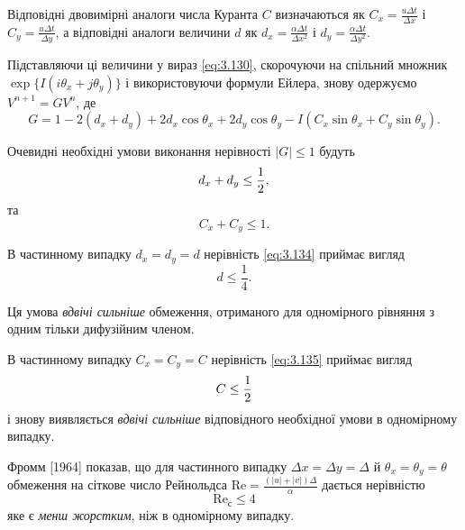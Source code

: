 \begin{definition}
    Відповідні двовимірні аналоги числа Куранта $C$ визначаються як $C_x = \frac{u \Delta t}{\Delta x}$ і $C_y = \frac{u \Delta t}{\Delta y}$, а відповідні аналоги величини $d$ як $d_x = \frac{\alpha \Delta t}{\Delta x^2}$ і $d_y = \frac{\alpha \Delta t}{\Delta y^2}$.
\end{definition}

Підставляючи ці величини у вираз \eqref{eq:3.130}, скорочуючи на спільний множник $\exp\{ I(i \theta_x + j \theta_y) \}$ і використовуючи формули Ейлера, знову одержуємо $V^{n + 1} = G V^n$, де
\begin{equation}
    \label{eq:3.133}
    G = 1 - 2 (d_x + d_y) + 2 d_x \cos \theta_x + 2 d_y \cos \theta_y - I (C_x \sin \theta_x + C_y \sin \theta_y).
\end{equation}

\begin{proposition}
    Очевидні необхідні умови виконання нерівності $|G| \le 1$ будуть
    \begin{equation}
        \label{eq:3.134}
        d_x + d_y \le \frac{1}{2},
    \end{equation}
    та
    \begin{equation}
        \label{eq:3.135}
        C_x + C_y \le 1.
    \end{equation}
\end{proposition}

\begin{example}
    В частинному випадку $d_x = d_y = d$ нерівність \eqref{eq:3.134} приймає вигляд
    \begin{equation}
        \label{eq:3.136}
        d \le \frac{1}{4}.
    \end{equation}
    
    Ця умова \emph{вдвічі сильніше} обмеження, отриманого для одномірного рівняння з одним тільки дифузійним членом. 
\end{example}

\begin{example}
    В частинному випадку $C_x = C_y = C$ нерівність \eqref{eq:3.135} приймає вигляд
    \begin{equation}
        \label{eq:3.137}
        C \le \frac{1}{2}
    \end{equation}
    і знову виявляється \emph{вдвічі сильніше} відповідного необхідної умови в одномірному випадку.
\end{example}

\begin{remark}
    Фромм [1964] показав, що для частинного випадку $\Delta x = \Delta y = \Delta$ й $\theta_x = \theta_y = \theta$ обмеження на сіткове число Рейнольдса $\text{Re} = \frac{(|u| + |v|) \Delta}{\alpha}$ дається нерівністю
    \begin{equation}
        \label{eq:3.138}
        \text{Re}_{\text{с}} \le 4
    \end{equation}
    яке є \emph{менш жорстким}, ніж в одномірному випадку.
\end{remark}

